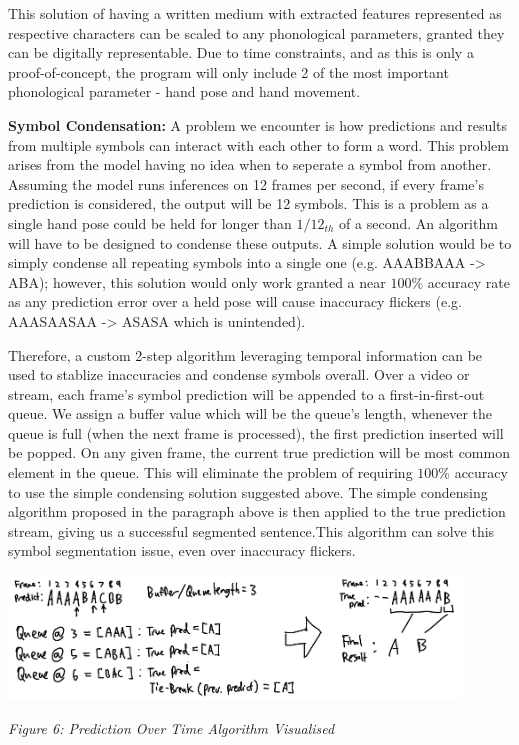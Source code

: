 \documentclass[11pt]{article}
\def\paraskip{\vskip 0.4cm}
\begin{document}
        This solution of having a written medium with extracted features represented as respective characters can be scaled to any phonological parameters, granted they can be digitally representable. Due to time constraints, and as this is only a proof-of-concept, the program will only include 2 of the most important phonological parameter - hand pose and hand movement.

        \paraskip

        \noindent\textbf{Symbol Condensation: }
        A problem we encounter is how predictions and results from multiple symbols can interact with each other to form a word. This problem arises from the model having no idea when to seperate a symbol from another. Assuming the model runs inferences on 12 frames per second, if every frame's prediction is considered, the output will be 12 symbols. This is a problem as a single hand pose could be held for longer than $1/12_{th}$ of a second. An algorithm will have to be designed to condense these outputs. A simple solution would be to simply condense all repeating symbols into a single one (e.g. AAABBAAA -> ABA); however, this solution would only work granted a near $100\%$ accuracy rate as any prediction error over a held pose will cause inaccuracy flickers (e.g. AAASAASAA -> ASASA which is unintended). 
        
        Therefore, a custom 2-step algorithm leveraging temporal information can be used to stablize inaccuracies and condense symbols overall. Over a video or stream, each frame's symbol prediction will be appended to a first-in-first-out queue. We assign a buffer value which will be the queue's length, whenever the queue is full (when the next frame is processed), the first prediction inserted will be popped. On any given frame, the current true prediction will be most common element in the queue. This will eliminate the problem of requiring $100\%$ accuracy to use the simple condensing solution suggested above. The simple condensing algorithm proposed in the paragraph above is then applied to the true prediction stream, giving us a successful segmented sentence.This algorithm can solve this symbol segmentation issue, even over inaccuracy flickers. 

        \begin{center}
            \includegraphics[width=12cm]{images/predOverTime.png}
            \\
            \raggedright \textit{
            Figure 6: Prediction Over Time Algorithm Visualised
            }
        \end{center}
\end{document}
